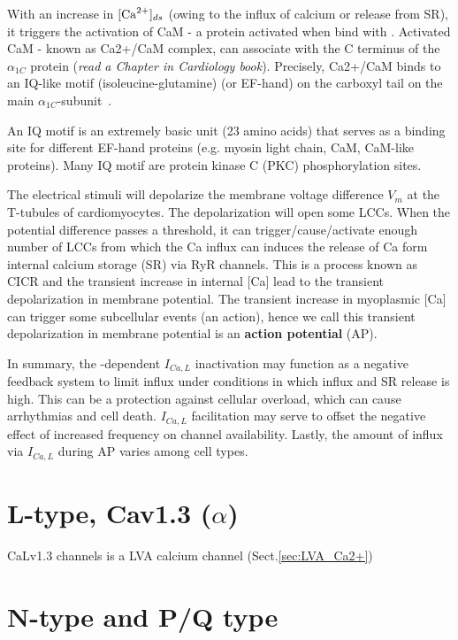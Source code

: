 With an increase in $[\ce{Ca^2+}]_{ds}$ (owing to the influx of
calcium or release from SR), it triggers the activation of CaM - a
protein activated when bind with . Activated CaM - known as
Ca2+/CaM complex, can associate with the C terminus of the $\alpha_{1C}$
protein ({\it read a Chapter in Cardiology book}).  Precisely, Ca2+/CaM
binds to an IQ-like motif (isoleucine-glutamine) (or EF-hand) on the
carboxyl tail on the main
$\alpha_{1C}$-subunit~\citep{zuhlke1999calm}.
 
\begin{framed}
  An IQ motif is an extremely basic unit (23 amino acids) that serves
  as a binding site for different EF-hand proteins (e.g. myosin light
  chain, CaM, CaM-like proteins). Many IQ motif are protein kinase C
  (PKC) phosphorylation sites. 
\end{framed}

The electrical stimuli will depolarize the membrane voltage difference
$V_m$ at the T-tubules of cardiomyocytes. The depolarization will open
some LCCs.  When the potential difference passes a threshold, it can
trigger/cause/activate enough number of LCCs from which the Ca influx
can induces the release of Ca form internal calcium storage (SR) via
RyR channels. This is a process known as CICR and the transient
increase in internal [Ca] lead to the transient depolarization in
membrane potential. The transient increase in myoplasmic [Ca] can
trigger some subcellular events (an action), hence we call this
transient depolarization in membrane potential is an
{\bf action potential} (AP).

In summary, the -dependent $I_{Ca,L}$ inactivation may
function as a negative feedback system to limit  influx
under conditions in which  influx and SR  release
is high. This can be a protection against cellular 
overload, which can cause arrhythmias and cell death. $I_{Ca,L}$
facilitation may serve to offset the negative effect of increased
frequency on  channel availability. Lastly, the amount of
 influx via $I_{Ca,L}$ during AP varies among cell types.

\section{L-type, Cav1.3 ($\alpha$)}
\label{sec:CaLv1.3-channel}

CaLv1.3 channels is a LVA calcium channel (Sect.\ref{sec:LVA_Ca2+})

\section{N-type and P/Q type}
\label{sec:N-and-P/Q-type}

